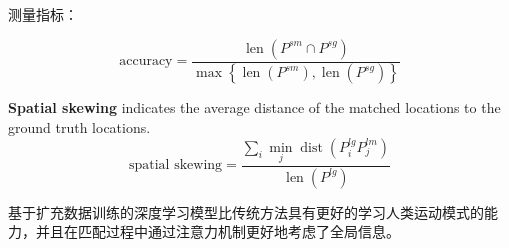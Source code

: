 测量指标：


 \begin{equation}\text{accuracy} =\frac{\operatorname{len}\left(P^{s m} \cap P^{s g}\right)}{\max \left\{\operatorname{len}\left(P^{s m}\right), \operatorname{len}\left(P^{s g}\right)\right\}} \end{equation}

 \textbf{Spatial skewing} indicates
the average distance of the matched locations to the ground
truth locations.
  \begin{equation}\text{spatial skewing} =\frac{\sum_{i} \min _{j} \operatorname{dist}\left(P_{i}^{l g} P_{j}^{l m}\right)}{\operatorname{len}\left(P^{l g}\right)} \end{equation}

基于扩充数据训练的深度学习模型比传统方法具有更好的学习人类运动模式的能力，并且在匹配过程中通过注意力机制更好地考虑了全局信息。